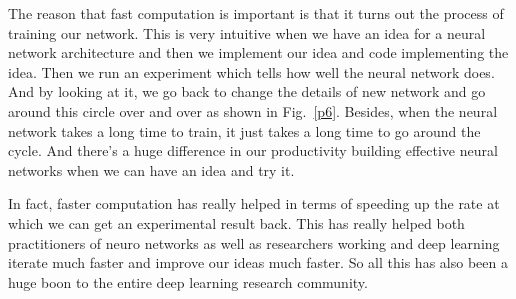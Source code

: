 \documentclass[a4paper]{article}
\begin{document}
The reason that fast computation is important is that it turns out the process of training our network. This is very intuitive when we have an idea for a neural network architecture and then we implement our idea and code implementing the idea. Then we run an experiment which tells how well the neural network does. And by looking at it, we go back to change the details of new network and go around this circle over and over as shown in Fig.~\ref{p6}. Besides, when the neural network takes a long time to train, it just takes a long time to go around the cycle. And there's a huge difference in our productivity building effective neural networks when we can have an idea and try it.

In fact, faster computation has really helped in terms of speeding up the rate at which we can get an experimental result back. This has really helped both practitioners of neuro networks as well as researchers working and deep learning iterate much faster and improve our ideas much faster. So all this has also been a huge boon to the entire deep learning research community.



\end{document}
